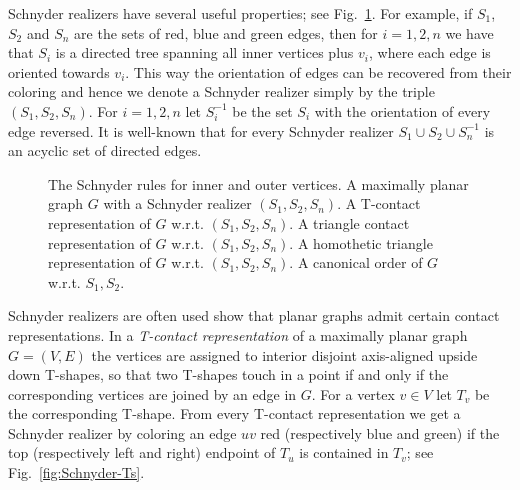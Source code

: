 \documentclass{llncs}
\begin{document}
Schnyder realizers have several useful properties; see Fig.~\ref{fig:Schnyder}. For example, if $S_1$, $S_2$ and $S_n$ are the sets of red, blue and green edges, then for $i=1,2,n$ we have that $S_i$ is a directed tree spanning all inner vertices plus $v_i$, where each edge is oriented towards $v_i$. This way the orientation of edges can be recovered from their coloring and hence we denote a Schnyder realizer simply by the triple $(S_1,S_2,S_n)$.
For $i=1,2,n$ let $S_i^{-1}$ be the set $S_i$ with the orientation of every edge reversed. It is well-known that for every Schnyder realizer $S_1 \cup S_2 \cup S_n^{-1}$ is an acyclic set of directed edges.

\begin{figure}[t!]
\centering
 \caption{ The Schnyder rules for inner and outer vertices.  A maximally planar graph $G$ with a Schnyder realizer $(S_1,S_2,S_n)$.  A T-contact representation of $G$ w.r.t. $(S_1,S_2,S_n)$.  A triangle contact representation of $G$ w.r.t. $(S_1,S_2,S_n)$.  A homothetic triangle representation of $G$ w.r.t. $(S_1,S_2,S_n)$.  A canonical order of $G$ w.r.t. $S_1,S_2$.}
 \label{fig:Schnyder}
\end{figure}

Schnyder realizers are often used show that planar graphs admit certain contact representations. In a \emph{T-contact representation} of a maximally planar graph $G = (V,E)$ the vertices are assigned to interior disjoint axis-aligned upside down T-shapes, so that two T-shapes touch in a point if and only if the corresponding vertices are joined by an edge in $G$. For a vertex $v \in V$ let $T_v$ be the corresponding T-shape. From every T-contact representation we get a Schnyder realizer by coloring an edge $uv$ red (respectively blue and green) if the top (respectively left and right) endpoint of $T_u$ is contained in $T_v$; see Fig.~\ref{fig:Schnyder-Ts}.
\end{document}

